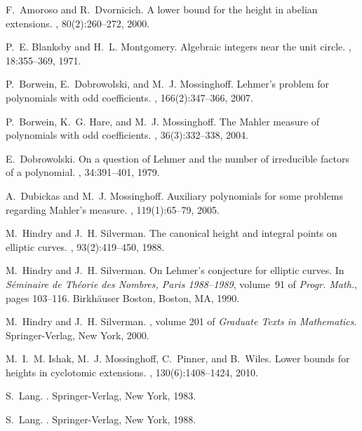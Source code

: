 \begin{thebibliography}{10}

F.~Amoroso and R.~Dvornicich.
\newblock A lower bound for the height in abelian extensions.
, 80(2):260--272, 2000.

P.~E. Blanksby and H.~L. Montgomery.
\newblock Algebraic integers near the unit circle.
, 18:355--369, 1971.

P.~Borwein, E.~Dobrowolski, and M.~J. Mossinghoff.
\newblock Lehmer's problem for polynomials with odd coefficients.
, 166(2):347--366, 2007.

P.~Borwein, K.~G. Hare, and M.~J. Mossinghoff.
\newblock The {M}ahler measure of polynomials with odd coefficients.
, 36(3):332--338, 2004.

E.~Dobrowolski.
\newblock On a question of {L}ehmer and the number of irreducible factors of a
  polynomial.
, 34:391--401, 1979.

A.~Dubickas and M.~J. Mossinghoff.
\newblock Auxiliary polynomials for some problems regarding {M}ahler's measure.
, 119(1):65--79, 2005.

M.~Hindry and J.~H. Silverman.
\newblock The canonical height and integral points on elliptic curves.
, 93(2):419--450, 1988.

M.~Hindry and J.~H. Silverman.
\newblock On {L}ehmer's conjecture for elliptic curves.
\newblock In {\em S\'eminaire de Th\'eorie des Nombres, Paris 1988--1989},
  volume~91 of {\em Progr. Math.}, pages 103--116. Birkh\"auser Boston, Boston,
  MA, 1990.

M.~Hindry and J.~H. Silverman.
, volume 201 of {\em
  Graduate Texts in Mathematics}.
\newblock Springer-Verlag, New York, 2000.

M.~I.~M. Ishak, M.~J. Mossinghoff, C.~Pinner, and B.~Wiles.
\newblock Lower bounds for heights in cyclotomic extensions.
, 130(6):1408--1424, 2010.

S.~Lang.
.
\newblock Springer-Verlag, New York, 1983.

S.~Lang.
.
\newblock Springer-Verlag, New York, 1988.


\end{thebibliography}
